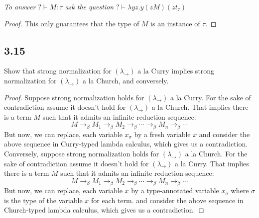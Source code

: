 \documentclass[12pt]{article}
\begin{document}
\textsl{To answer $? \vdash M : \tau$ ask the question $? \vdash \lambda yz.y(zM)(zt_\tau)$} \\

\begin{proof}
This only guarantees that the type of $M$ is an instance of $\tau$.
\end{proof}

\subsection*{3.15}
Show that strong normalization for $(\lambda_\rightarrow)$ a la Curry implies strong normalization for $(\lambda_\rightarrow)$ a la Church, and conversely. 

\begin{proof}
Suppose strong normalization holds for $(\lambda_{\rightarrow})$ a la Curry. For the sake of contradiction assume it doesn't hold for $(\lambda_{\rightarrow})$ a la Church. That implies there is a term $M$ such that it admits an infinite reduction sequence:
$$M \rightarrow_\beta M_1 \rightarrow_\beta M_2 \rightarrow_\beta \cdots \rightarrow_\beta M_n \rightarrow_\beta \cdots$$
But now, we can replace, each variable $x_\sigma$ by a fresh variable $x$ and consider the above sequence in Curry-typed lambda calculus, which gives us a contradiction. \\

Conversely, suppose strong normalization holds for $(\lambda_{\rightarrow})$ a la Church. For the sake of contradiction assume it doesn't hold for $(\lambda_{\rightarrow})$ a la Curry. That implies there is a term $M$ such that it admits an infinite reduction sequence:
$$M \rightarrow_\beta M_1 \rightarrow_\beta M_2 \rightarrow_\beta \cdots \rightarrow_\beta M_n \rightarrow_\beta \cdots$$
But now, we can replace, each variable $x$ by a type-annotated variable $x_\sigma$ where $\sigma$ is the type of the variable $x$ for each term. and consider the above sequence in Church-typed lambda calculus, which gives us a contradiction.
\end{proof}

\vspace{1in} %
\end{document}
